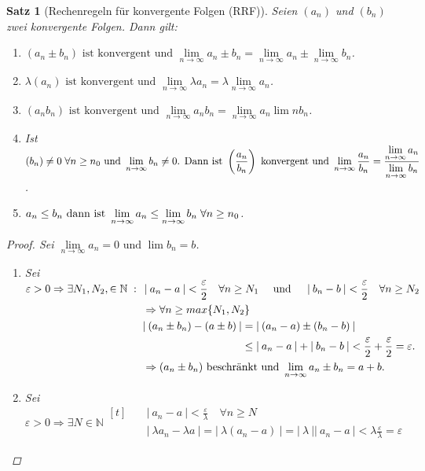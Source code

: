 \documentclass[a4paper,titlepage,oneside]{article}
\def\N{\ensuremath{\mathbb{N}} }
\renewcommand{\epsilon}{\ensuremath{\varepsilon} }
\def\sp{\hspace{0,1cm}}
\def\spcolon{\sp:\sp}
\renewcommand{\liminf}[2][n]{\ensuremath{\lim\limits_{#1 \rightarrow \infty}{#2}}}
\newcommand{\abs}[1]{\ensuremath{\left|\:#1\:\right|}}
\theoremstyle{thmstyle}
\newtheorem{satz}{Satz}[section]
\theoremstyle{subthmstyle}
\begin{document}
\begin{satz}[Rechenregeln für konvergente Folgen (RRF)]
Seien \((a_n)\) und \((b_n)\) zwei konvergente Folgen. Dann gilt:
\begin{enumerate}
\item \((a_n \pm b_n)\text{ ist konvergent und }\liminf{a_n  \pm  b_n} = \liminf{a_n}  \pm \liminf{b_n}\).
\item \(\lambda (a_n)\text{ ist konvergent und }\liminf{\lambda a_n} = \lambda \liminf{a_n}\).
\item \((a_n b_n)\text{ ist konvergent und }\liminf{a_n b_n} = \liminf{a_n} \lim{n}{b_n}\).
\item Ist $ \displaystyle (b_n) \ne 0 \sp \forall n \ge n_0\text{ und }\liminf{b_n} \ne 0\text{. Dann ist } \left(\frac{a_n}{b_n}\right) \text{ konvergent und }\liminf{\frac{a_n}{b_n}} = \frac{\liminf{a_n}}{\liminf{b_n}}$.
\item \(a_n \le b_n \text{ dann ist }\liminf{a_n} \le \liminf{b_n} \sp \forall n \ge n_0\).
\end{enumerate}
\begin{proof}
Sei \(\liminf{a_n} = 0\text{ und } \lim{b_n} = b\).
\begin{enumerate}
\item Sei $\epsilon > 0 \Rightarrow \exists N_1, N_2, \in \N \spcolon
\begin{aligned}[t]
&\abs{a_n - a} < \frac{\epsilon}{2} \quad \forall n \ge N_1 \quad \text{ und } \quad  \abs{b_n - b} < \frac{\epsilon}{2} \quad \forall n \ge N_2\\
&\Rightarrow \forall n \ge max\{N_1, N_2\}\\
& \begin{aligned}[t]
\abs{(a_n \pm b_n) - (a \pm b)} &= \abs{(a_n - a) \pm (b_n - b)} \\
&\le \abs{a_n - a} + \abs{b_n - b} < \frac{\epsilon}{2} + \frac{\epsilon}{2} = \epsilon.
\end{aligned}\\
&\Rightarrow (a_n \pm b_n) \text{ beschränkt und } \liminf{a_n \pm b_n} = a+b.
\end{aligned}$
\item Sei $ \displaystyle \epsilon > 0 \Rightarrow \exists N \in \N \begin{aligned}[t] \quad
		&\abs{a_n - a} < \frac{\epsilon}{\lambda} \quad \forall n \ge N\\
		& \abs{\lambda a_n - \lambda a} = \abs{\lambda(a_n - a)} = \abs{\lambda}\abs{a_n - a} < \lambda \frac{\epsilon}{\lambda} = \epsilon
		\end{aligned}$

\end{enumerate}
\end{proof}
\end{satz}
\end{document}
